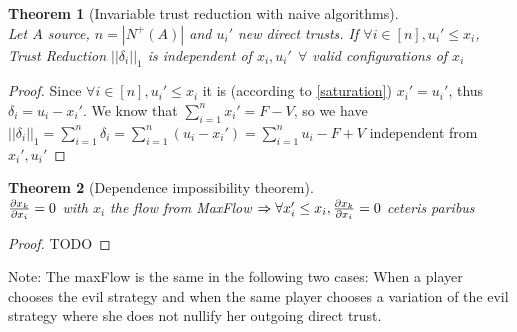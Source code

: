 \documentclass[11pt]{article}
\newtheorem{theorem}{Theorem}[section]
\theoremstyle{definition}
\theoremstyle{corollary}
\theoremstyle{lemma}
\begin{document}
    \begin{theorem}[Invariable trust reduction with naive algorithms] \ \\
    \label{invariability}
       Let $A$ source, $n = |N^{+}(A)|$ and $u_i'$ new direct trusts. If $\forall i \in [n],u_i' \leq x_i$,
       Trust Reduction $||\delta_i||_1$ is independent of $x_i, u_i' \:\: \forall$ valid configurations of $x_i$
    \end{theorem}
    \begin{proof} 
       Since $\forall i \in [n],u_i' \leq x_i$ it is (according to \ref{saturation}) $x_i' = u_i'$, thus
       $\delta_i = u_i - x_i'$. We know that $\sum\limits_{i=1}^{n}x_i' = F - V$, so we have $||\delta_i||_1 =
       \sum\limits_{i=1}^{n}\delta_i = \sum\limits_{i=1}^{n}(u_i - x_i') = \sum\limits_{i=1}^{n}u_i - F + V$ independent
       from $x_i', u_i'$
    \end{proof}

    \begin{theorem}[Dependence impossibility theorem] \ \\
    \label{independence}
       ${\partial x_k \over \partial x_i} = 0$ with $x_i$ the flow from MaxFlow $\Rightarrow
         \forall x_i' \leq x_i, {\partial x_k \over \partial x_i} = 0$ ceteris paribus
    \end{theorem}
    \begin{proof}
       TODO
    \end{proof}
    Note: The maxFlow is the same in the following two cases: When a player chooses the evil strategy and when the same
    player chooses a variation of the evil strategy where she does not nullify her outgoing direct trust.
\end{document}
